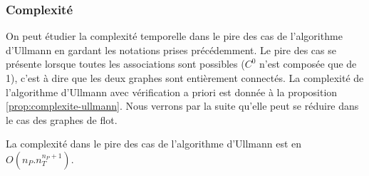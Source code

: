 


\subsubsection{Complexité \label{sec:ullmann_complexite}}
On peut étudier la complexité temporelle dans le pire des cas de l'algorithme d'Ullmann en gardant les notations prises précédemment.
Le pire des cas se présente lorsque toutes les associations sont possibles \cite{MessPhd} ($C^0$ n'est composée que de 1), c'est à dire que les deux graphes sont entièrement connectés. La complexité de l'algorithme d'Ullmann avec vérification a priori est donnée à la proposition \ref{prop:complexite-ullmann}.
Nous verrons par la suite qu'elle peut se réduire dans le cas des graphes de flot.

\begin{prop}
La complexité dans le pire des cas de l'algorithme d'Ullmann est en $O(n_P.n_T^{n_P+1})$.
\label{prop:complexite-ullmann}
\end{prop}

